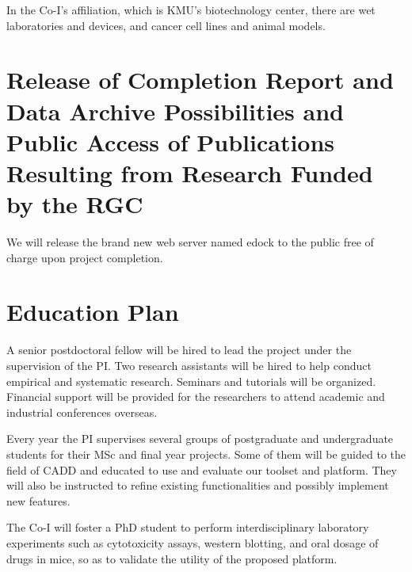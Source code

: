 \documentclass[a4paper,12pt]{article}
\begin{document}
In the Co-I's affiliation, which is KMU's biotechnology center, there are wet laboratories and devices, and cancer cell lines and animal models.

\section*{Release of Completion Report and Data Archive Possibilities and Public Access of Publications Resulting from Research Funded by the RGC}

We will release the brand new web server named edock to the public free of charge upon project completion.


\section*{Education Plan}

A senior postdoctoral fellow will be hired to lead the project under the supervision of the PI. Two research assistants will be hired to help conduct empirical and systematic research. Seminars and tutorials will be organized. Financial support will be provided for the researchers to attend academic and industrial conferences overseas.

Every year the PI supervises several groups of postgraduate and undergraduate students for their MSc and final year projects. Some of them will be guided to the field of CADD and educated to use and evaluate our toolset and platform. They will also be instructed to refine existing functionalities and possibly implement new features.

The Co-I will foster a PhD student to perform interdisciplinary laboratory experiments such as cytotoxicity assays, western blotting, and oral dosage of drugs in mice, so as to validate the utility of the proposed platform.

\newpage
\linespread{0.5}
\footnotesize


\end{document}
